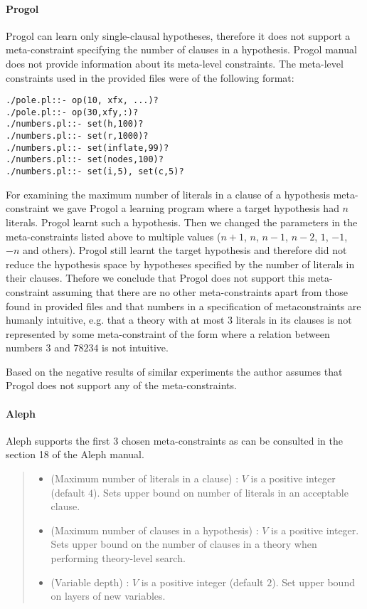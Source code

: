 \paragraph{Progol}
Progol can learn only single-clausal hypotheses\cite{muggleton2012mc}, therefore it does not support a meta-constraint specifying the number of clauses in a hypothesis.
Progol manual does not provide information about its meta-level constraints. The meta-level constraints used in the provided files\cite{muggleton1999progolWebsite} were of the following format:
\begin{lstlisting}
./pole.pl::- op(10, xfx, ...)?
./pole.pl::- op(30,xfy,:)?
./numbers.pl::- set(h,100)?
./numbers.pl::- set(r,1000)?
./numbers.pl::- set(inflate,99)?
./numbers.pl::- set(nodes,100)?
./numbers.pl::- set(i,5), set(c,5)?
\end{lstlisting}
For examining the maximum number of literals in a clause of a hypothesis meta-constraint we gave Progol a learning program where a target hypothesis had $n$ literals. Progol learnt such a hypothesis. Then we changed the parameters in the meta-constraints listed above to multiple values ($n+1$, $n$, $n-1$, $n-2$, $1$, $-1$, $-n$ and others). Progol still learnt the target hypothesis and therefore did not reduce the hypothesis space by hypotheses specified by the number of literals in their clauses. Thefore we conclude that Progol does not support this meta-constraint assuming that there are no other meta-constraints apart from those found in provided files and that numbers in a specification of metaconstraints are humanly intuitive, e.g. that a theory with at most $3$ literals in its clauses is not represented by some meta-constraint of the form  where a relation between numbers $3$ and $78234$ is not intuitive.

Based on the negative results of similar experiments the author assumes that Progol does not support any of the meta-constraints.

\paragraph{Aleph}
Aleph supports the first 3 chosen meta-constraints as can be consulted in the section 18 of the Aleph manual\cite{aleph2007}.
\begin{quote}
\begin{itemize}
\item (Maximum number of literals in a clause) :
$V$ is a positive integer (default $4$). Sets upper bound on number of literals in an acceptable clause.
\item (Maximum number of clauses in a hypothesis) :
$V$ is a positive integer. Sets upper bound on the number of clauses in a theory  when performing theory-level search.
\item (Variable depth) : $V$ is a positive integer (default $2$). Set upper bound on layers of new variables.
\end{itemize}
\end{quote}

